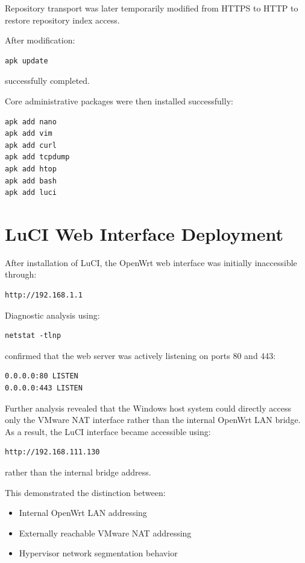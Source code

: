 \documentclass[conference]{IEEEtran}
\begin{document}
Repository transport was later temporarily modified from HTTPS to HTTP to restore repository index access.

After modification:

\begin{lstlisting}
apk update
\end{lstlisting}

successfully completed.

Core administrative packages were then installed successfully:

\begin{lstlisting}
apk add nano
apk add vim
apk add curl
apk add tcpdump
apk add htop
apk add bash
apk add luci
\end{lstlisting}

\section{LuCI Web Interface Deployment}

After installation of LuCI, the OpenWrt web interface was initially inaccessible through:

\begin{lstlisting}
http://192.168.1.1
\end{lstlisting}

Diagnostic analysis using:

\begin{lstlisting}
netstat -tlnp
\end{lstlisting}

confirmed that the web server was actively listening on ports 80 and 443:

\begin{lstlisting}
0.0.0.0:80 LISTEN
0.0.0.0:443 LISTEN
\end{lstlisting}

Further analysis revealed that the Windows host system could directly access only the VMware NAT interface rather than the internal OpenWrt LAN bridge. As a result, the LuCI interface became accessible using:

\begin{lstlisting}
http://192.168.111.130
\end{lstlisting}

rather than the internal bridge address.

This demonstrated the distinction between:

\begin{itemize}
    \item Internal OpenWrt LAN addressing
    \item Externally reachable VMware NAT addressing
    \item Hypervisor network segmentation behavior
\end{itemize}
\end{document}
